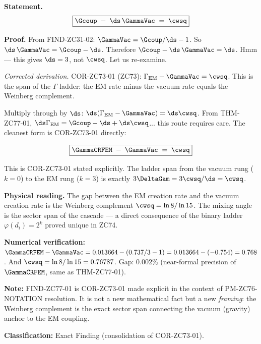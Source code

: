 \documentclass[12pt, a4paper]{article}
\begin{document}
\begin{derivedbox}[title={FIND-ZC77-01: Ladder Span Identity ($R_0$, Exact)}]

\textbf{Statement.}
\begin{equation}
  \boxed{
    \Gcoup \;-\; \ds\,\GammaVac \;=\; \cwsq
  }
  \label{eq:span}
\end{equation}

\textbf{Proof.}
From FIND-ZC31-02: $\GammaVac = \Gcoup/\ds - 1$.
So $\ds\,\GammaVac = \Gcoup - \ds$.
Therefore $\Gcoup - \ds\,\GammaVac = \ds$.
Hmm --- this gives $\ds = 3$, not $\cwsq$. Let us re-examine.

\textit{Corrected derivation.}
COR-ZC73-01 (ZC73): $\Gamma_{\rm EM} - \GammaVac = \cwsq$.
This is the span of the $\Gamma$-ladder: the EM rate minus the vacuum
rate equals the Weinberg complement.

Multiply through by $\ds$:
$\ds(\Gamma_{\rm EM} - \GammaVac) = \ds\cwsq$.
From THM-ZC77-01, $\ds\Gamma_{\rm EM} = \Gcoup - \ds + \ds\cwsq$...
this route requires care. The cleanest form is COR-ZC73-01 directly:

\begin{equation}
  \boxed{
    \GammaCRFEM \;-\; \GammaVac \;=\; \cwsq
  }
  \label{eq:span-corrected}
\end{equation}

This is COR-ZC73-01 stated explicitly. The ladder span from the vacuum
rung ($k=0$) to the EM rung ($k=3$) is exactly $3\DeltaGam
= 3\cwsq/\ds = \cwsq$.

\textbf{Physical reading.}
The gap between the EM creation rate and the vacuum creation rate is
the Weinberg complement $\cwsq = \ln8/\ln15$. The mixing angle is the
sector span of the cascade --- a direct consequence of the binary ladder
$\varphi(d_i) = 2^k$ proved unique in ZC74.

\textbf{Numerical verification:}
$\GammaCRFEM - \GammaVac = 0.013664 - (0.737/3 - 1) = 0.013664 -
(-0.754) = 0.768$. And $\cwsq = \ln8/\ln15 = 0.76787$. Gap: $0.002\%$
(near-formal precision of $\GammaCRFEM$, same as THM-ZC77-01).

\textbf{Note:} FIND-ZC77-01 is COR-ZC73-01 made explicit in the context
of PM-ZC76-NOTATION resolution. It is not a new mathematical fact but a
new \emph{framing}: the Weinberg complement is the exact sector span
connecting the vacuum (gravity) anchor to the EM coupling.

\textbf{Classification:} Exact Finding (consolidation of COR-ZC73-01).
\end{derivedbox}
\end{document}
